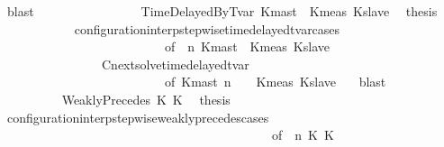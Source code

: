 \begin{isabellebody}
\ blast\isanewline
\ \ \ \ \ \ \isamarkupfalse%
\isanewline
\ \ \ \ \ \ \ \ \isamarkupfalse%
\ {\isacharparenleft}TimeDelayedByTvar\ Kmast\ {\isasymtau}\ Kmeas\ Kslave{\isacharparenright}\ \isamarkupfalse%
\ {\isacharquery}thesis\isanewline
\ \ \ \ \ \ \ \ \ \ \isamarkupfalse%
\ configuration{\isacharunderscore}interp{\isacharunderscore}stepwise{\isacharunderscore}timedelayed{\isacharunderscore}tvar{\isacharunderscore}cases\isanewline
\ \ \ \ \ \ \ \ \ \ \ \ \ \ \ \ \ \ \ \ \ \ \ \ \ \ {\isacharbrackleft}of\ {\isacartoucheopen}{\isasymGamma}{\isacartoucheclose}\ {\isacartoucheopen}n{\isacartoucheclose}\ {\isacartoucheopen}Kmast{\isacartoucheclose}\ {\isacartoucheopen}{\isasymtau}{\isacartoucheclose}\ {\isacartoucheopen}Kmeas{\isacartoucheclose}\ {\isacartoucheopen}Kslave{\isacartoucheclose}\ {\isacartoucheopen}{\isasymPsi}{\isacartoucheclose}\ {\isacartoucheopen}{\isasymPhi}{\isacartoucheclose}{\isacharbrackright}\isanewline
\ \ \ \ \ \ \ \ \ \ \ \ \ \ \ \ Cnext{\isacharunderscore}solve{\isacharunderscore}timedelayed{\isacharunderscore}tvar\isanewline
\ \ \ \ \ \ \ \ \ \ \ \ \ \ \ \ \ \ \ \ \ \ \ \ \ \ {\isacharbrackleft}of\ {\isacartoucheopen}Kmast{\isacartoucheclose}\ {\isacartoucheopen}n{\isacartoucheclose}\ {\isacartoucheopen}{\isasymGamma}{\isacartoucheclose}\ {\isacartoucheopen}{\isasymPsi}{\isacartoucheclose}\ {\isacartoucheopen}{\isasymtau}{\isacartoucheclose}\ {\isacartoucheopen}Kmeas{\isacartoucheclose}\ {\isacartoucheopen}Kslave{\isacartoucheclose}\ {\isacartoucheopen}{\isasymPhi}{\isacartoucheclose}{\isacharbrackright}\ \isamarkupfalse%
\ blast\isanewline
\ \ \ \ \ \ \isamarkupfalse%
\isanewline
\ \ \ \ \ \ \ \ \isamarkupfalse%
\ {\isacharparenleft}WeaklyPrecedes\ K{}\ K{}{\isacharparenright}\ \isamarkupfalse%
\ {\isacharquery}thesis\isanewline
\ \ \ \ \ \ \ \ \ \ \isamarkupfalse%
\ configuration{\isacharunderscore}interp{\isacharunderscore}stepwise{\isacharunderscore}weakly{\isacharunderscore}precedes{\isacharunderscore}cases\isanewline
\ \ \ \ \ \ \ \ \ \ \ \ \ \ \ \ \ \ \ \ \ \ \ \ \ \ \ \ \ \ \ \ \ \ \ \ \ \ \ \ \ \ \ {\isacharbrackleft}of\ {\isacartoucheopen}{\isasymGamma}{\isacartoucheclose}\ {\isacartoucheopen}n{\isacartoucheclose}\ {\isacartoucheopen}K{}{\isacartoucheclose}\ {\isacartoucheopen}K{}{\isacartoucheclose}\ {\isacartoucheopen}{\isasymPsi}{\isacartoucheclose}\ {\isacartoucheopen}{\isasymPhi}{\isacartoucheclose}{\isacharbrackright}\isanewline

\end{isabellebody}

